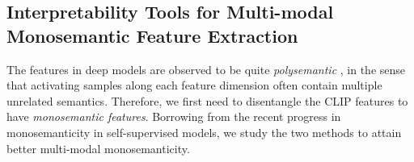 


\subsection{Interpretability Tools for Multi-modal Monosemantic Feature Extraction}
The features in deep models are observed to be quite \emph{polysemantic} \citep{olah2020zoom}, in the sense that activating samples along each feature dimension often contain multiple unrelated semantics. Therefore, we first need to disentangle the CLIP features to have \emph{monosemantic features}. Borrowing from the recent progress in monosemanticity in self-supervised models, we study the two methods to attain better multi-modal monosemanticity.


